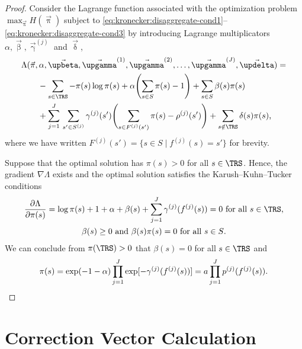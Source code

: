 \begin{proof}
  Consider the Lagrange function associated with the optimization
  problem $\max_{\vec{\uppi}} H(\vec{\uppi})$ subject to
  \eqref{eq:kronecker:disaggregate-cond1}--%
  \eqref{eq:kronecker:disaggregate-cond3} by introducing Lagrange
  multiplicators $\alpha, \vec{\upbeta}, \vec{\upgamma}^{(j)}$ and
  $\vec{\updelta}$,
  \begin{equation}
    \begin{aligned}
      & \Lambda(\vec{\pi}, \alpha, \vec{\upbeta},
      \vec{\upgamma}^{(1)}, \vec{\upgamma}^{(2)}, \ldots,
      \vec{\upgamma}^{(J)},
      \vec{\updelta}) =\\
      &\qquad - \sum_{s \in \TRS} - \pi(s) \log \pi(s) + \alpha
      \Biggl( \sum_{s \in S} \pi(s) - 1 \Biggr) + \sum_{s \in S}
      \beta(s) \pi(s) \\
      &\qquad + \sum_{j = 1}^{J} \, \sum_{s' \in S^{(j)}}
      \gamma^{(j)}(s') \Biggl( \sum_{s \in F^{(j)}(s')} \pi(s) -
      \rho^{(j)}(s') \Biggr) + \sum_{s \notin \TRS} \delta(s) \pi(s)
      \text,
    \end{aligned}
  \end{equation}
  where we have written $F^{(j)}(s') = \{ s \in S \mid f^{(j)}(s) = s'
  \}$ for brevity.

  Suppose that the optimal solution has $\pi(s) > 0$ for all
  $s \in \TRS$. Hence, the gradient $\nabla \Lambda$ exists and the
  optimal solution satisfies the Karush--Kuhn--Tucker conditions
  \begin{gather}
    \frac{\partial \Lambda}{\partial \pi(s)}
    = \log \pi(s) + 1 + \alpha + \beta(s) + \sum_{j = 1}^{J}
    \gamma^{(j)}(f^{(j)}(s)) = 0 \text{ for all $s \in \TRS$,} \\
    \beta(s) \ge 0 \text{ and } \beta(s) \pi(s) = 0 \text{ for all $s
      \in S$.}
  \end{gather}
  We can conclude from $\pi(\TRS) > 0$ that $\beta(s) = 0$ for all
  $s \in \TRS$ and
  \begin{equation}
    \pi(s) = \exp (-1 - \alpha) \prod_{j = 1}^J \exp
    [ -\gamma^{(j)}(f^{(j)}(s)) ]
    = a \prod_{j = 1}^J p^{(j)}(f^{(j)}(s)) \text.
  \end{equation}
\end{proof}

\section{Correction Vector Calculation}

